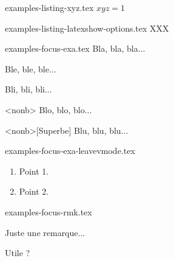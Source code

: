 \begin{filecontents*}{examples-listing-xyz.tex}
$x y z = 1$
\end{filecontents*}


\begin{filecontents*}{examples-listing-latexshow-options.tex}
XXX
\end{filecontents*}


\begin{filecontents*}{examples-focus-exa.tex}
Bla, bla, bla...

\begin{bdocexa}
    Ble, ble, ble...
\end{bdocexa}

\begin{bdocexa}[Magnifique]
    Bli, bli, bli...
\end{bdocexa}

\begin{bdocexa}<nonb>
    Blo, blo, blo...
\end{bdocexa}

\begin{bdocexa}<nonb>[Superbe]
    Blu, blu, blu...
\end{bdocexa}

\end{filecontents*}


\begin{filecontents*}{examples-focus-exa-leavevmode.tex}
\begin{bdocexa}
    \leavevmode

    \begin{enumerate}
        \item Point 1.

        \item Point 2.
    \end{enumerate}
\end{bdocexa}

\end{filecontents*}


\begin{filecontents*}{examples-focus-rmk.tex}
\begin{bdocrem}
    Juste une remarque...
\end{bdocrem}

\begin{bdocrem}
    Utile ?
\end{bdocrem}

\end{filecontents*}



